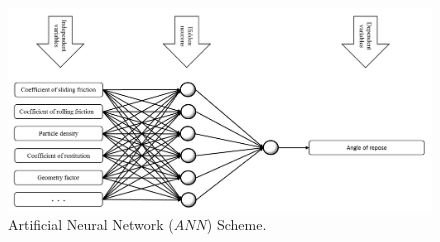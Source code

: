 \begin{figure}[!htb]
\centering
\includegraphics[width=.96\columnwidth]{images/018nnscheme}
\caption[ANN Scheme]{Artificial Neural Network ($ANN$) Scheme.}
\label{fig:018nnscheme}
\end{figure}